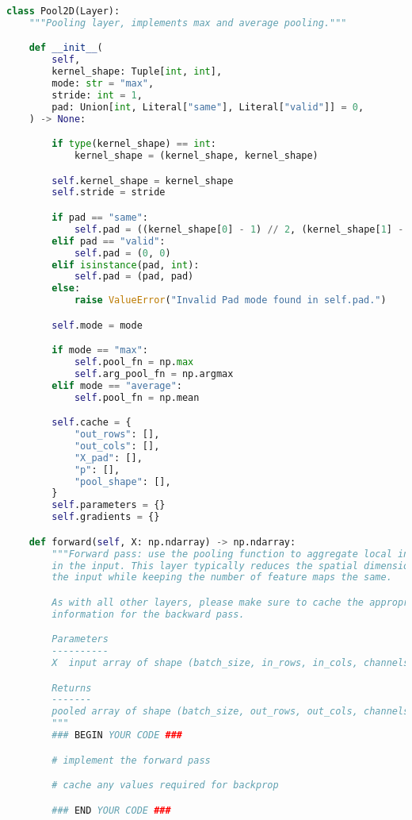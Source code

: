 \begin{lstlisting}[language=Python]
class Pool2D(Layer):
    """Pooling layer, implements max and average pooling."""

    def __init__(
        self,
        kernel_shape: Tuple[int, int],
        mode: str = "max",
        stride: int = 1,
        pad: Union[int, Literal["same"], Literal["valid"]] = 0,
    ) -> None:

        if type(kernel_shape) == int:
            kernel_shape = (kernel_shape, kernel_shape)

        self.kernel_shape = kernel_shape
        self.stride = stride

        if pad == "same":
            self.pad = ((kernel_shape[0] - 1) // 2, (kernel_shape[1] - 1) // 2)
        elif pad == "valid":
            self.pad = (0, 0)
        elif isinstance(pad, int):
            self.pad = (pad, pad)
        else:
            raise ValueError("Invalid Pad mode found in self.pad.")

        self.mode = mode

        if mode == "max":
            self.pool_fn = np.max
            self.arg_pool_fn = np.argmax
        elif mode == "average":
            self.pool_fn = np.mean

        self.cache = {
            "out_rows": [],
            "out_cols": [],
            "X_pad": [],
            "p": [],
            "pool_shape": [],
        }
        self.parameters = {}
        self.gradients = {}

    def forward(self, X: np.ndarray) -> np.ndarray:
        """Forward pass: use the pooling function to aggregate local information
        in the input. This layer typically reduces the spatial dimensionality of
        the input while keeping the number of feature maps the same.

        As with all other layers, please make sure to cache the appropriate
        information for the backward pass.

        Parameters
        ----------
        X  input array of shape (batch_size, in_rows, in_cols, channels)

        Returns
        -------
        pooled array of shape (batch_size, out_rows, out_cols, channels)
        """
        ### BEGIN YOUR CODE ###

        # implement the forward pass

        # cache any values required for backprop

        ### END YOUR CODE ###


\end{lstlisting}
